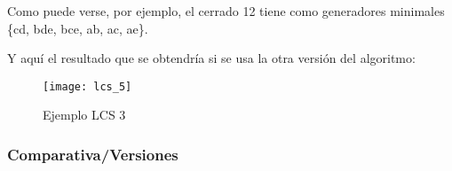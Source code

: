 Como puede verse, por ejemplo, el cerrado 12 tiene como generadores minimales \{cd, bde, bce, ab, ac, ae\}.

Y aqu\'i el resultado que se obtendr\'ia si se usa la otra versi\'on del algoritmo:
\begin{figure}[H]
    \centering
    \texttt{[image: lcs\_5]}
    \caption{Ejemplo LCS 3}
    \label{fig:lcs_5}
\end{figure}
\newpage
\subsubsection{Comparativa/Versiones} 